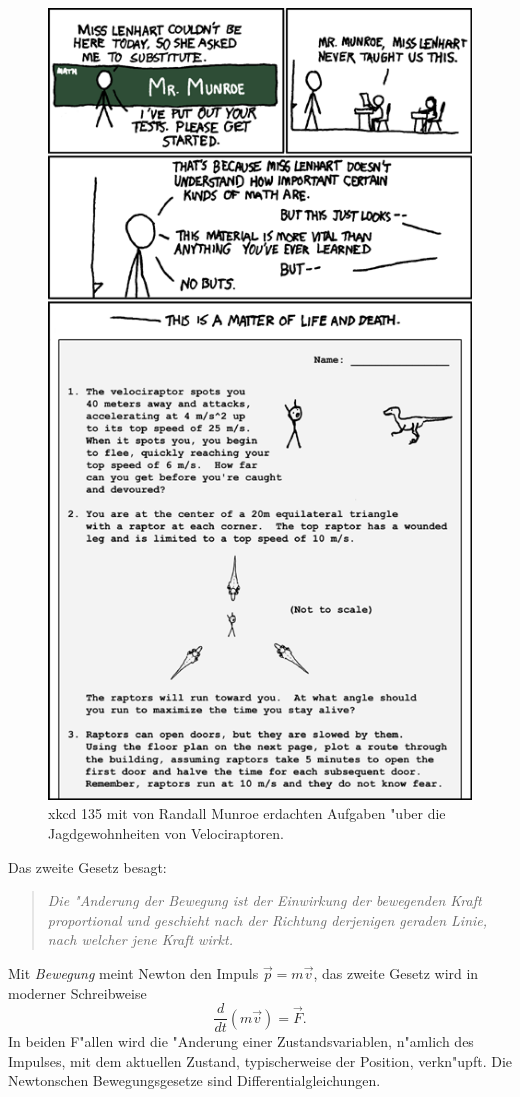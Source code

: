 \begin{figure}
\centering
\includegraphics[width=0.7\hsize]{chapters/substitute.png}
\caption{xkcd 135 mit von Randall Munroe erdachten Aufgaben "uber die
Jagdgewohnheiten von Velociraptoren.
\label{einleitung:xkcd135}}
\end{figure}%


Das zweite Gesetz besagt:
\begin{quote}
\em
Die "Anderung der Bewegung ist der Einwirkung der bewegenden Kraft
proportional und geschieht nach der Richtung derjenigen geraden Linie,
nach welcher jene Kraft wirkt.
\end{quote}
Mit {\em Bewegung}
meint Newton den Impuls $\vec{p}=m\vec{v}$,
das zweite Gesetz wird in moderner Schreibweise
\[
\frac{d}{dt}(m\vec{v}) = \vec{F}.
\]
In beiden F"allen wird die "Anderung einer Zustandsvariablen, n"amlich
des Impulses, mit dem aktuellen Zustand, typischerweise der Position,
verkn"upft.
Die Newtonschen Bewegungsgesetze sind Differentialgleichungen.

